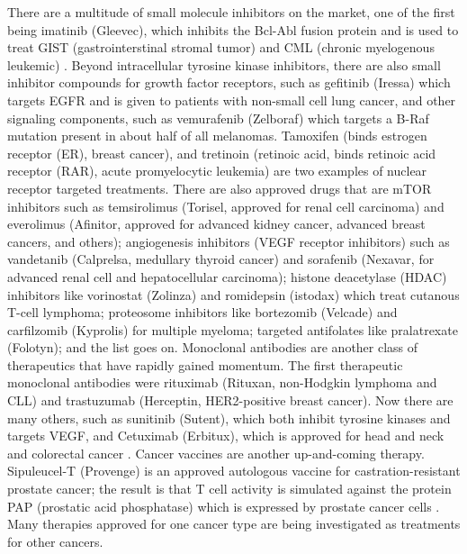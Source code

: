 \documentclass[12pt]{article}
\begin{document}
There are a multitude of small molecule inhibitors on the market, one of the first being imatinib (Gleevec), which inhibits the Bcl-Abl fusion protein and is used to treat GIST (gastrointerstinal stromal tumor) and CML (chronic myelogenous leukemic) \cite{Vanneman2012}. Beyond intracellular tyrosine kinase inhibitors, there are also small inhibitor compounds for growth factor receptors, such as gefitinib (Iressa) which targets EGFR and is given to patients with non-small cell lung cancer, and other signaling components, such as vemurafenib (Zelboraf) which targets a B-Raf mutation present in about half of all melanomas. Tamoxifen (binds estrogen receptor (ER), breast cancer), and tretinoin (retinoic acid, binds retinoic acid receptor (RAR), acute promyelocytic leukemia) are two examples of nuclear receptor targeted treatments. There are also approved drugs that are mTOR inhibitors such as temsirolimus (Torisel, approved for renal cell carcinoma) and everolimus (Afinitor, approved for advanced kidney cancer, advanced breast cancers, and others); angiogenesis inhibitors (VEGF receptor inhibitors) such as vandetanib (Calprelsa, medullary thyroid cancer) and sorafenib (Nexavar, for advanced renal cell and hepatocellular carcinoma); histone deacetylase (HDAC) inhibitors like vorinostat (Zolinza) and romidepsin (istodax) which treat cutanous T-cell lymphoma; proteosome inhibitors like bortezomib (Velcade) and carfilzomib (Kyprolis) for multiple myeloma; targeted antifolates like pralatrexate (Folotyn); and the list goes on. Monoclonal antibodies are another class of therapeutics that have rapidly gained momentum. The first therapeutic monoclonal antibodies were rituximab (Rituxan, non-Hodgkin lymphoma and CLL) and trastuzumab (Herceptin, HER2-positive breast cancer). Now there are many others, such as sunitinib (Sutent), which both inhibit tyrosine kinases and targets VEGF, and Cetuximab (Erbitux), which is approved for head and neck and colorectal cancer \cite{CancerTargetedTherapies}. Cancer vaccines are another up-and-coming therapy. Sipuleucel-T (Provenge) is an approved autologous vaccine for castration-resistant prostate cancer; the result is that T cell activity is simulated against the protein PAP (prostatic acid phosphatase) which is expressed by prostate cancer cells \cite{Vanneman2012}. Many therapies approved for one cancer type are being investigated as treatments for other cancers. 
\end{document}

